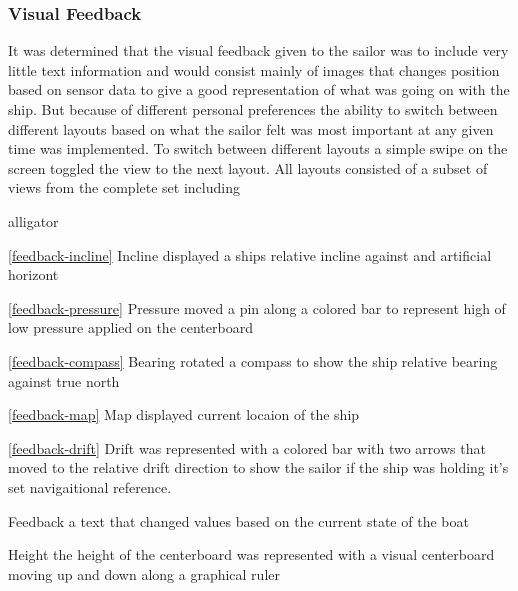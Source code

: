 \subsubsection{Visual Feedback}
It was determined that the visual feedback given to the sailor was to include very little text information and would consist mainly of images that changes position based on sensor data to give a good representation of what was going on with the ship. But because of different personal preferences the ability to switch between different layouts based on what the sailor felt was most important at any given time was implemented. To switch between different layouts a simple swipe on the screen toggled the view to the next layout. All layouts consisted of a subset of views from the complete set including
\begin{labeling}{alligator}
\item [\ref{feedback-incline} Incline]  displayed a ships relative incline against and artificial horizont
\item [\ref{feedback-pressure} Pressure] moved a pin along a colored bar to represent high of low pressure applied on the centerboard
\item [\ref{feedback-compass} Bearing] rotated a compass to show the ship relative bearing against true north
\item [\ref{feedback-map} Map] displayed current locaion of the ship
\item [\ref{feedback-drift} Drift] was represented with a colored bar with two arrows that moved to the relative drift direction to show the sailor if the ship was holding it's set navigaitional reference.
\item [Feedback] a text that changed values based on the current state of the boat
\item [Height] the height of the centerboard was represented with a visual centerboard moving up and down along a graphical ruler
\end{labeling}

